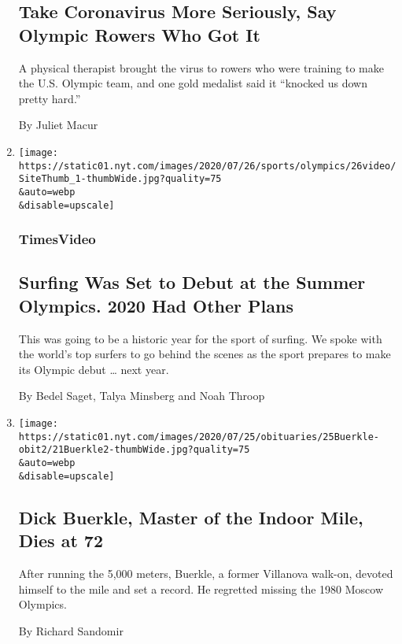 \begin{enumerate}
  \hypertarget{take-coronavirus-more-seriously-say-olympic-rowers-who-got-it}{%
  \subsection{Take Coronavirus More Seriously, Say Olympic Rowers Who
  Got
  It}\label{take-coronavirus-more-seriously-say-olympic-rowers-who-got-it}}

  A physical therapist brought the virus to rowers who were training to
  make the U.S. Olympic team, and one gold medalist said it ``knocked us
  down pretty hard.''

  By Juliet Macur
\item
  \href{/video/sports/olympics/100000007219144/summer-olympics.html}{}

  \texttt{[image: https://static01.nyt.com/images/2020/07/26/sports/olympics/26video/SiteThumb\_1-thumbWide.jpg?quality=75\\\&auto=webp\\\&disable=upscale]}

  \hypertarget{timesvideo}{%
  \subsubsection{TimesVideo}\label{timesvideo}}

  \hypertarget{surfing-was-set-to-debut-at-the-summer-olympics-2020-had-other-plans}{%
  \subsection{Surfing Was Set to Debut at the Summer Olympics. 2020 Had
  Other
  Plans}\label{surfing-was-set-to-debut-at-the-summer-olympics-2020-had-other-plans}}

  This was going to be a historic year for the sport of surfing. We
  spoke with the world's top surfers to go behind the scenes as the
  sport prepares to make its Olympic debut \ldots{} next year.

  By Bedel Saget, Talya Minsberg and Noah Throop
\item
  \href{/2020/07/21/sports/olympics/dick-buerkle-master-of-the-indoor-mile-dies-at-72.html}{}

  \texttt{[image: https://static01.nyt.com/images/2020/07/25/obituaries/25Buerkle-obit2/21Buerkle2-thumbWide.jpg?quality=75\\\&auto=webp\\\&disable=upscale]}

  \hypertarget{dick-buerkle-master-of-the-indoor-mile-dies-at-72}{%
  \subsection{Dick Buerkle, Master of the Indoor Mile, Dies at
  72}\label{dick-buerkle-master-of-the-indoor-mile-dies-at-72}}

  After running the 5,000 meters, Buerkle, a former Villanova walk-on,
  devoted himself to the mile and set a record. He regretted missing the
  1980 Moscow Olympics.

  By Richard Sandomir
\end{enumerate}

